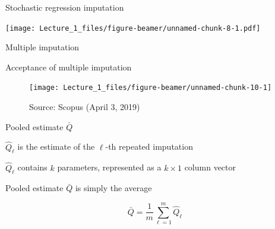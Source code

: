 \documentclass[ignorenonframetext,aspectratio=43]{beamer}
\begin{document}
\begin{frame}{Stochastic regression imputation}
\protect\hypertarget{stochastic-regression-imputation}{}

\texttt{[image: Lecture\_1\_files/figure-beamer/unnamed-chunk-8-1.pdf]}

\end{frame}

\begin{frame}{Multiple imputation}
\protect\hypertarget{multiple-imputation}{}


\end{frame}

\begin{frame}{Acceptance of multiple imputation}
\protect\hypertarget{acceptance-of-multiple-imputation}{}

\begin{figure}
\texttt{[image: Lecture\_1\_files/figure-beamer/unnamed-chunk-10-1]} \caption{Source: Scopus (April 3, 2019)}\label{fig:unnamed-chunk-10}
\end{figure}

\end{frame}

\begin{frame}{Pooled estimate \(\bar Q\)}
\protect\hypertarget{pooled-estimate-bar-q}{}

\(\hat Q_\ell\) is the estimate of the \(\ell\)-th repeated imputation

\(\hat Q_\ell\) contains \(k\) parameters, represented as a
\(k \times 1\) column vector

Pooled estimate \(\bar Q\) is simply the average

\[ 
\bar Q = \frac{1}{m}\sum_{\ell=1}^m \hat Q_\ell
\]

\end{frame}
\end{document}
